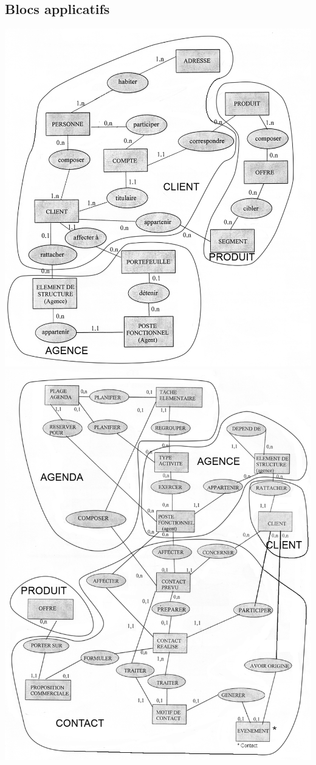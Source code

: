 \subsection{Blocs applicatifs}

\begin {center}
\includegraphics[width=\textwidth]{Decoupage MCD 1.png}
\includegraphics[width=\textwidth]{Decoupage MCD 2.png}
\end {center}

